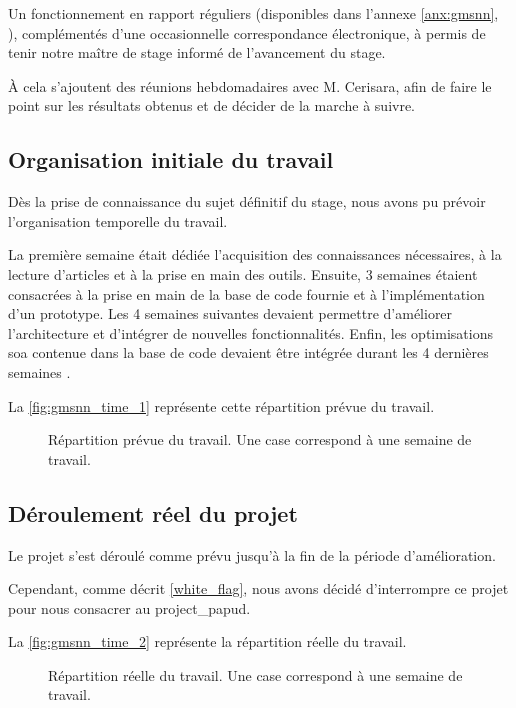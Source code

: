 Un fonctionnement en rapport réguliers (disponibles dans l'annexe \ref{anx:gmsnn}, ), complémentés d'une occasionnelle correspondance électronique, à permis de tenir notre maître de stage informé de l'avancement du stage.

À cela s'ajoutent des réunions hebdomadaires avec M. Cerisara, afin de faire le point sur les résultats obtenus et de décider de la marche à suivre.

\subsection{Organisation initiale du travail}
Dès la prise de connaissance du sujet définitif du stage, 
nous avons pu prévoir l'organisation temporelle du travail.

La première semaine était dédiée l'acquisition des connaissances nécessaires, à la lecture d'articles et à la prise en main des outils.
Ensuite, 3 semaines étaient consacrées à la prise en main de la base de code fournie et à l'implémentation d'un prototype.
Les 4 semaines suivantes devaient permettre d'améliorer l'architecture et d'intégrer de nouvelles fonctionnalités.
Enfin, les optimisations \gls{soa} contenue dans la base de code devaient être intégrée durant les 4 dernières semaines .

La \autoref{fig:gmsnn_time_1} représente cette répartition prévue du travail.

\begin{figure}[ht]
	\centering
	\caption[Répartition prévue du travail]{Répartition prévue du travail. Une case correspond à une semaine de travail.}\label{fig:gmsnn_time_1}
\end{figure}

\subsection{Déroulement réel du projet}
Le projet s'est déroulé comme prévu jusqu'à la fin de la période d'amélioration.

Cependant, comme décrit \autoref{white_flag}, nous avons décidé d'interrompre ce projet pour nous consacrer au \gls{project_papud}.

La \autoref{fig:gmsnn_time_2} représente la répartition réelle du travail.

\begin{figure}[ht]
	\centering
	\caption[Répartition réelle du travail]{Répartition réelle du travail. Une case correspond à une semaine de travail.}\label{fig:gmsnn_time_2}
\end{figure}

